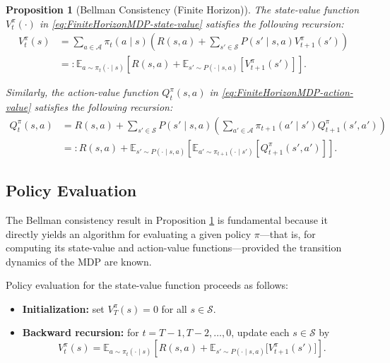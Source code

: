 \documentclass[
]{book}
\providecommand{\tightlist}{%
  \setlength{\itemsep}{0pt}\setlength{\parskip}{0pt}}
\newtheorem{proposition}{Proposition}[chapter]
\theoremstyle{definition}
\theoremstyle{definition}
\theoremstyle{definition}
\theoremstyle{definition}
\theoremstyle{remark}
\begin{document}
\begin{proposition}[Bellman Consistency (Finite Horizon)]
\protect\hypertarget{prp:BellmanConsistency}{}\label{prp:BellmanConsistency}The state-value function \(V^{\pi}_t(\cdot)\) in \eqref{eq:FiniteHorizonMDP-state-value} satisfies the following recursion:
\begin{equation}
\begin{split}
V^{\pi}_t(s) & = \sum_{a \in \mathcal{A}} \pi_t(a\mid s) \left( R(s,a) + \sum_{s' \in \mathcal{S}} P(s' \mid s, a) V^{\pi}_{t+1} (s') \right) \\
    & =: \mathbb{E}_{a \sim \pi_t(\cdot \mid s)} \left[ R(s, a) + \mathbb{E}_{s' \sim P(\cdot \mid s, a)} [V^{\pi}_{t+1}(s')] \right].
\end{split}
\label{eq:BellmanConsistency-State-Value}
\end{equation}

Similarly, the action-value function \(Q^{\pi}_t(s,a)\) in \eqref{eq:FiniteHorizonMDP-action-value} satisfies the following recursion:
\begin{equation}
\begin{split}
Q^{\pi}_t (s, a) & = R(s,a) + \sum_{s' \in \mathcal{S}} P(s' \mid s, a) \left( \sum_{a' \in \mathcal{A}} \pi_{t+1}(a' \mid s') Q^{\pi}_{t+1}(s', a')\right) \\
& =: R(s, a) + \mathbb{E}_{s' \sim P(\cdot \mid s, a)} \left[\mathbb{E}_{a' \sim \pi_{t+1}(\cdot \mid s')} [Q^{\pi}_{t+1}(s', a')] \right].
\end{split}
\label{eq:BellmanConsistency-Action-Value}
\end{equation}
\end{proposition}

\subsection{Policy Evaluation}\label{policy-evaluation}

The Bellman consistency result in Proposition \ref{prp:BellmanConsistency} is fundamental because it directly yields an algorithm for evaluating a given policy \(\pi\)---that is, for computing its state-value and action-value functions---provided the transition dynamics of the MDP are known.

Policy evaluation for the state-value function proceeds as follows:

\begin{itemize}
\tightlist
\item
  \textbf{Initialization:} set \(V^{\pi}_T(s) = 0\) for all \(s \in \mathcal{S}\).\\
\item
  \textbf{Backward recursion:} for \(t = T-1, T-2, \dots, 0\), update each \(s \in \mathcal{S}\) by
  \[
  V^{\pi}_{t}(s) = \mathbb{E}_{a \sim \pi_t(\cdot \mid s)} \left[ R(s, a) + \mathbb{E}_{s' \sim P(\cdot \mid s, a)} \big[ V^{\pi}_{t+1}(s') \big] \right].
  \]
\end{itemize}
\end{document}
